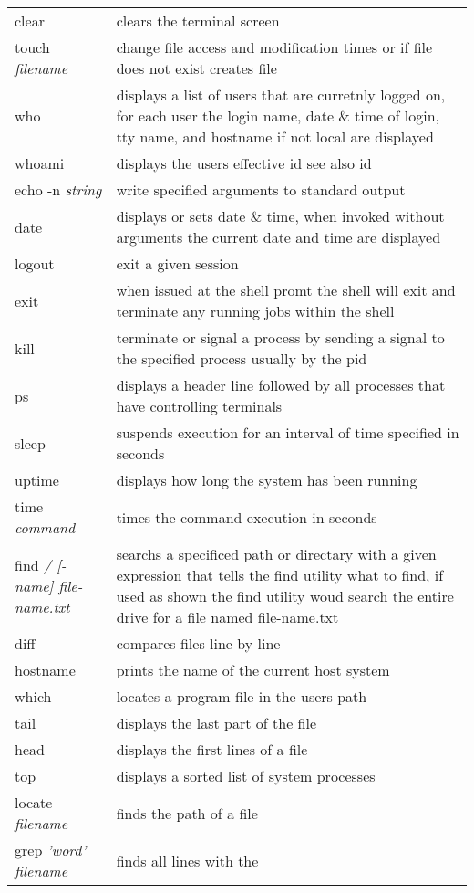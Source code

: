 \begin{center}
\begin{longtable}{|p{4cm}|p{8cm}|}
  clear & clears the terminal screen \\
  touch \textit{filename} & change file access and modification times
  or if file does not exist creates file \\
  who & displays a list of users that are curretnly logged on, for
  each user the login name, date \& time of login, tty name, and
  hostname if not local are displayed\\
  whoami & displays the users effective id see also id \\
  echo -n \textit{string} & write specified arguments to standard output \\
  date & displays or sets date \& time, when invoked without arguments
  the current date and time are displayed\\
  logout & exit a given session\\
  exit & when issued at the shell promt the shell will exit and
  terminate any running jobs within the shell\\
  kill & terminate or signal a process by sending a signal to the
  specified process usually by the pid  \\
  ps & displays a header line followed by all processes that have
  controlling terminals\\
  sleep & suspends execution for an interval of time specified in seconds \\
  uptime & displays how long the system has been running \\
  time  \emph{command} & times the command execution in seconds\\
  find \textit{ / [-name] file-name.txt} &
  searchs a specificed path or directary with a given expression that
  tells the find utility what to find, if used as shown the find
  utility woud search the entire drive for a file named file-name.txt\\
  diff & compares files line by line \\
  hostname & prints the name of the current host system \\
  which & locates a program file in the users path \\
  tail & displays the last part of the file \\
  head & displays the first lines of a file \\
  top & displays a sorted list of system processes \\
  locate \textit{filename} & finds the path of a file\\
  grep \textit{'word'} \textit{filename} & finds all lines with the

\end{longtable}
\end{center}
